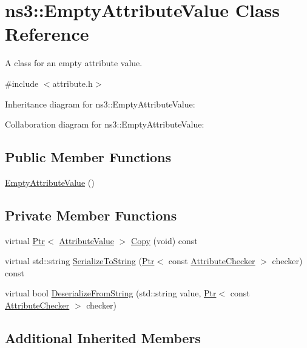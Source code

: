 \hypertarget{classns3_1_1EmptyAttributeValue}{}\section{ns3\+:\+:Empty\+Attribute\+Value Class Reference}
\label{classns3_1_1EmptyAttributeValue}


A class for an empty attribute value.  




{\ttfamily \#include $<$attribute.\+h$>$}



Inheritance diagram for ns3\+:\+:Empty\+Attribute\+Value\+:


Collaboration diagram for ns3\+:\+:Empty\+Attribute\+Value\+:
\subsection*{Public Member Functions}
\begin{DoxyCompactItemize}
\item 
\hyperlink{classns3_1_1EmptyAttributeValue_a754e2a1e2285db03c8af21bf5fd60416}{Empty\+Attribute\+Value} ()
\end{DoxyCompactItemize}
\subsection*{Private Member Functions}
\begin{DoxyCompactItemize}
\item 
virtual \hyperlink{classns3_1_1Ptr}{Ptr}$<$ \hyperlink{classns3_1_1AttributeValue}{Attribute\+Value} $>$ \hyperlink{classns3_1_1EmptyAttributeValue_a2c7955f9757fc5e6e2be002dfee39a5c}{Copy} (void) const 
\item 
virtual std\+::string \hyperlink{classns3_1_1EmptyAttributeValue_a6102940d7bd133e41cdcfb51e4b24bed}{Serialize\+To\+String} (\hyperlink{classns3_1_1Ptr}{Ptr}$<$ const \hyperlink{classns3_1_1AttributeChecker}{Attribute\+Checker} $>$ checker) const 
\item 
virtual bool \hyperlink{classns3_1_1EmptyAttributeValue_adab2981be46c9cbf0d8d9973ac25e34e}{Deserialize\+From\+String} (std\+::string value, \hyperlink{classns3_1_1Ptr}{Ptr}$<$ const \hyperlink{classns3_1_1AttributeChecker}{Attribute\+Checker} $>$ checker)
\end{DoxyCompactItemize}
\subsection*{Additional Inherited Members}


